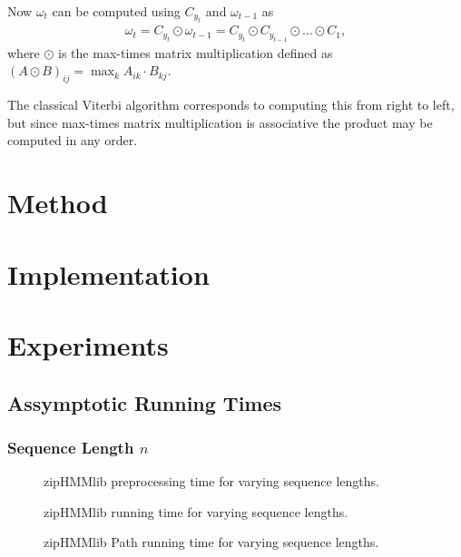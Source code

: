 \documentclass[11pt,twoside,a4,danish,english,report]{memoir}
\begin{document}
Now $\omega_t$ can be computed using $C_{y_t}$ and $\omega_{t - 1}$ as
\begin{align*}
  \omega_t = C_{y_t} \odot \omega_{t - 1} = C_{y_t} \odot C_{y_{t-1}} \odot
  \dots \odot C_1,
\end{align*}
where $\odot$ is the max-times matrix multiplication defined as ${(A \odot
  B)}_{ij} = \max_k A_{ik} \cdot B_{kj}$.

The classical Viterbi algorithm corresponds to computing this from right to
left, but since max-times matrix multiplication is associative the product may
be computed in any order.

\chapter{Method}
\label{cha:method}

\chapter{Implementation}
\label{cha:implementation}

\chapter{Experiments}
\label{cha:experiments}

\section{Assymptotic Running Times}
\label{sec:assymp-runn-times}

\subsection{Sequence Length $n$}
\label{sec:sequence-length-n}

\begin{figure}[H]
  \centering
  
  \caption{zipHMMlib preprocessing time for varying sequence lengths.}
  \label{fig:pre_viterbi_n}
\end{figure}

\begin{figure}[H]
  \centering
  
  \caption{zipHMMlib running time for varying sequence lengths.}
  \label{fig:assymptotic_viterbi_n}
\end{figure}

\begin{figure}[H]
  \centering
  
  \caption{zipHMMlib Path running time for varying sequence lengths.}
  \label{fig:assymptotic_viterbi_path_n}
\end{figure}
\end{document}

